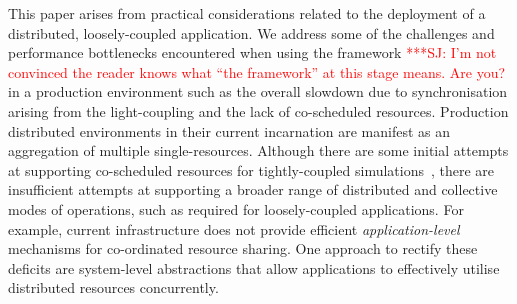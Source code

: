 \documentclass{rspublic}
\newcommand{\jhanote}[1]{ {\textcolor{red} { ***SJ: #1 }}}
\newcommand{\jhanote}[1]{}
\begin{document}
This paper arises from practical considerations related to the
deployment of a distributed, loosely-coupled application.  We address
some of the challenges and performance bottlenecks encountered when
using the framework \jhanote{I'm not convinced the reader knows what
  ``the framework'' at this stage means. Are you?} in a production
environment %
such as the overall slowdown due to synchronisation arising from the
light-coupling and the lack of co-scheduled resources. Production
distributed environments in their current incarnation are manifest as
an aggregation of multiple single-resources. Although there are some
initial attempts at supporting co-scheduled resources for
tightly-coupled simulations~\citep{repex_mpig}, there are insufficient
attempts at supporting a broader range of distributed and collective
modes of operations, such as required for loosely-coupled
applications.  For example, current infrastructure does not provide
efficient {\it application-level} mechanisms for co-ordinated resource
sharing. One approach to rectify these deficits are system-level
abstractions that allow applications to effectively utilise
distributed resources concurrently.
\end{document}
